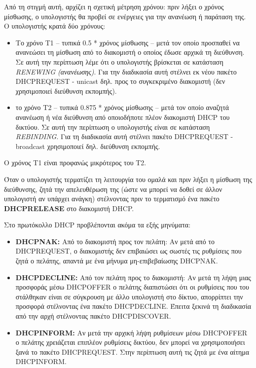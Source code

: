 Από τη στιγμή αυτή, αρχίζει η σχετική μέτρηση χρόνου: πριν λήξει ο χρόνος μίσθωσης, ο υπολογιστής θα προβεί σε ενέργειες για την ανανέωση ή παράταση της. Ο υπολογιστής κρατά δύο χρόνους:

\begin{itemize}
\item Το χρόνο Τ1 -- τυπικά 0.5 * χρόνος μίσθωσης -- μετά τον οποίο προσπαθεί να ανανεώσει τη μίσθωση από το διακομιστή ο οποίος έδωσε αρχικά τη διεύθυνση. Σε αυτή την περίπτωση λέμε ότι ο υπολογιστής βρίσκεται σε κατάσταση \emph{RENEWING (ανανέωσης)}. Για την διαδικασία αυτή στέλνει εκ νέου πακέτο DHCPREQUEST - unicast δηλ. προς το συγκεκριμένο διακομιστή (δεν χρησιμοποιεί διεύθυνση εκπομπής). 
\item το χρόνο Τ2 -- τυπικά 0.875 * χρόνος μίσθωσης -- μετά τον οποίο αναζητά ανανέωση ή νέα διεύθυνση από οποιοδήποτε πλέον διακομιστή DHCP του δικτύου. Σε αυτή την περίπτωση ο υπολογιστής είναι σε κατάσταση \emph{RE\-BIND\-ING}. Για τη διαδικασία αυτή στέλνει πακέτο DHCPREQUEST - broadcast χρησιμοποιεί δηλ. διεύθυνση εκπομπής. 
\end{itemize}

Ο χρόνος Τ1 είναι προφανώς μικρότερος του T2.

Όταν ο υπολογιστής τερματίζει τη λειτουργία του ομαλά και πριν λήξει η μίσθωση της διεύθυνσης, ζητά την απελευθέρωση της (ώστε να μπορεί να δοθεί σε άλλον υπολογιστή αν υπάρχει ανάγκη) στέλνοντας πριν το τερματισμό ένα πακέτο\\ \textbf{DHCPRELEASE} στο διακομιστή DHCP.

Στο πρωτόκολλο DHCP προβλέπονται ακόμα τα εξής μηνύματα:

\begin{itemize}
\item \textbf{DHCPNAK:} Από το διακομιστή προς τον πελάτη: Αν μετά από το\\ DHCPREQUEST, ο διακομιστής δεν επιβαιώσει ως σωστές τις ρυθμίσεις που ζητά ο πελάτης, απαντά με ένα μήνυμα μη-επιβεβαίωσης DHCPNAK.
\item \textbf{DHCPDECLINE:} Από τον πελάτη προς το διακομιστή: Αν μετά τη λήψη μιας προσφοράς μέσω DHCPOFFER ο πελάτης διαπιστώσει ότι οι ρυθμίσεις που του στάλθηκαν είναι σε σύγκρουση με άλλο υπολογιστή στο δίκτυο, απορρίπτει την προσφορά στέλνοντας ένα πακέτο DHCPDECLINE. Έπειτα ξεκινά τη διαδικασία από την αρχή στέλνοντας πακέτο DHCPDISCOVER.
\item \textbf{DHCPINFORM:} Αν μετά την αρχική λήψη ρυθμίσεων μέσω DHCPOFFER ο πελάτης χρειάζεται επιπλέον ρυθμίσεις δικτύου, δεν μπορεί να χρησιμοποιήσει ξανά το πακέτο DHCPREQUEST. Στην περίπτωση αυτή τις ζητά με ένα αίτημα DHCPINFORM. 
\end{itemize}

